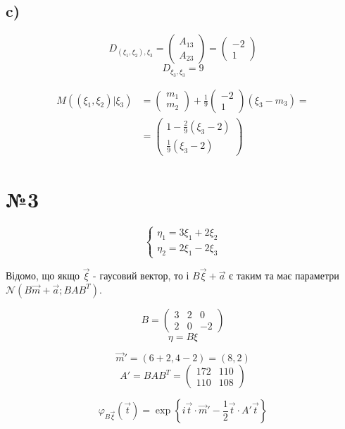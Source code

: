 \documentclass[11pt, a4paper]{article} %
\begin{document}
\subsection*{c)}
$$D_{(\xi_1,\xi_2),\xi_3} = \begin{pmatrix}
    A_{13} \\ A_{23}
\end{pmatrix} = \begin{pmatrix}
    -2 \\ 1
\end{pmatrix}$$
$$D_{\xi_3,\xi_3} = 9$$

\begin{align*}
    M((\xi_1,\xi_2)|\xi_3) &= \begin{pmatrix}
        m_1 \\ m_2
    \end{pmatrix} + \frac{1}{9}\begin{pmatrix}
    -2 \\ 1
\end{pmatrix} (\xi_3 - m_3) = \\
    &= \begin{pmatrix}
        1 - \frac{2}{9} (\xi_3 - 2) \\
        \frac{1}{9} (\xi_3 - 2)
    \end{pmatrix}
\end{align*}
\pagebreak


\section*{№3}
$$\begin{cases}
    \eta_1 = 3\xi_1 + 2\xi_2\\
    \eta_2 = 2\xi_1 - 2\xi_3
\end{cases}$$

Відомо, що якщо $\vec\xi$ - гаусовий вектор, то і $B\vec\xi + \vec a$ є таким 
та має параметри $\mathcal N(B\vec m + \vec a; BAB^T)$.

$$B = \begin{pmatrix}
    3 & 2 & 0 \\
    2 & 0 & -2
\end{pmatrix}$$
$$\eta = B \xi$$

$$\vec m' = ( 6+2 , 4-2) = (8,2)$$
$$A' = BAB^T = \begin{pmatrix}
    172 & 110 \\
    110 & 108
\end{pmatrix}$$

$$\varphi_{B\vec\xi}(\vec t) = \exp \left\{ i\vec t \cdot \vec m' - \frac{1}{2} \vec t \cdot A' \vec t \right\}$$
\end{document}
